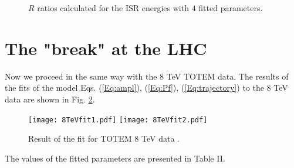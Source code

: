 \documentclass[aps,prd,superscriptaddress,showpacs,preprintnumbers]{revtex4}
\begin{document}
\begin{figure}[H]  
	\centering
	\hfill
	\hfill
	\hfill
	\hfill
	
	\caption{$R$ ratios calculated for the ISR \cite{ISR} energies with $4$ fitted parameters.}
	\label{Fig:ISR_normb}
\end{figure}


\section{The "break" at the LHC} \label{Sec:LHC}
Now we proceed in the same way with the $8$ TeV TOTEM data. The results of the fits of the model Eqs. (\ref{Eq:ampl}),  (\ref{Eq:Pf}), (\ref{Eq:trajectory}) to the $8$ TeV data \cite{TOTEM8} are shown in Fig. \ref{Fig:8TeV_fit}.
\begin{figure}[H]
	\centering
	\texttt{[image: 8TeVfit1.pdf]}
	\texttt{[image: 8TeVfit2.pdf]}
	\caption{Result of the fit for TOTEM $8$ TeV data \cite{TOTEM8}.}
	\label{Fig:8TeV_fit}
\end{figure}
The values of the fitted parameters are presented in Table II.
\end{document}
